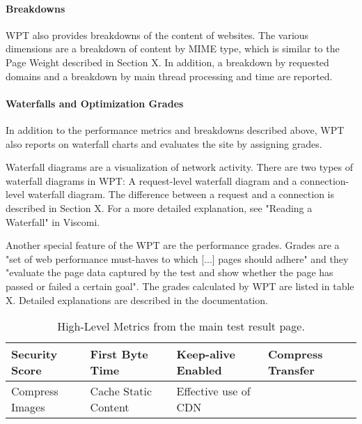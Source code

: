 

\paragraph{Breakdowns} %

WPT also provides breakdowns of the content of websites.
The various dimensions are a breakdown of content by MIME type, which is similar to the Page Weight described in Section X.
In addition, a breakdown by requested domains and a breakdown by main thread processing and time are reported.



\paragraph{Waterfalls and Optimization Grades} %

In addition to the performance metrics and breakdowns described above, WPT also reports on waterfall charts and evaluates the site by assigning grades.


Waterfall diagrams are a visualization of network activity.
There are two types of waterfall diagrams in WPT:
A request-level waterfall diagram and a connection-level waterfall diagram.
The difference between a request and a connection is described in Section X.
For a more detailed explanation, see "Reading a Waterfall" in Viscomi.




Another special feature of the WPT are the performance grades.
Grades are a "set of web performance must-haves to which [...] pages should adhere" and they "evaluate the page data captured by the test and show whether the page has passed or failed a certain goal". %
The grades calculated by WPT are listed in table X.
Detailed explanations are described in the documentation.

\begin{table}[h]
	\small
	\centering
	\begin{tabular}{| l | l | l | l |}
	\hline
	Security Score & First Byte Time & Keep-alive Enabled & Compress Transfer \\
	\hline
	Compress Images & Cache Static Content & Effective use of CDN & \\	
	\hline
	\end{tabular}
	\medskip
	\caption{High-Level Metrics from the main test result page.}
	\label{table:wpt_metrics_categories}
\end{table}



